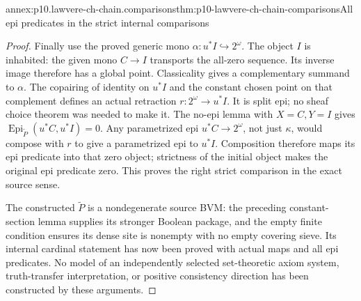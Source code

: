 \begin{annexitem}{annex:p10.lawvere-ch-chain.comparisons}{thm:p10-lawvere-ch-chain-comparisons}{All epi predicates in the strict internal comparisons}
\begin{proof}
Finally use the proved generic mono \(\alpha:u^*I\hookrightarrow2^\omega\).
The object \(I\) is inhabited: the given mono \(C\to I\) transports
the all-zero sequence. Its inverse image therefore has a global point.
Classicality gives a complementary summand to \(\alpha\).
The copairing of identity on \(u^*I\) and the constant chosen point
on that complement defines an actual retraction
\(r:2^\omega\to u^*I\). It is split epi; no sheaf choice theorem
was needed to make it.
The no-epi lemma with \(X=C,Y=I\) gives
\(\operatorname{Epi}_{\widetilde P}(u^*C,u^*I)=0\).
Any parametrized epi \(u^*C\to2^\omega\), not just \(\kappa\),
would compose with \(r\) to give a parametrized epi to \(u^*I\).
Composition therefore maps its epi predicate into that zero object;
strictness of the initial object makes the original epi predicate zero.
This proves the right strict comparison in the exact source sense.

The constructed \(\widetilde P\) is a nondegenerate source BVM:
the preceding constant-section lemma supplies its stronger Boolean
package, and the empty finite condition ensures its dense site is
nonempty with no empty covering sieve. Its internal cardinal statement
has now been proved with actual maps and all epi predicates.
No model of an independently selected set-theoretic axiom system,
truth-transfer interpretation, or positive consistency direction has
been constructed by these arguments.
\end{proof}
\end{annexitem}
